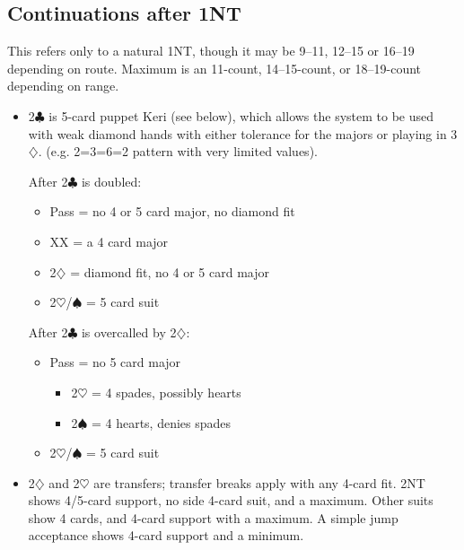 \documentclass[a4paper,14pt]{extarticle}
\begin{document}
\newpage

\subsection{Continuations after 1NT}
\label{sec:resp:1n}


This refers only to a natural 1NT, though it may be 9--11, 12--15 or 16--19
depending on route. Maximum is an 11-count, 14--15-count, or 18--19-count
depending on range.

\begin{itemize}

\item 2$\clubsuit$ is 5-card puppet Keri (see below), which allows the system to be used with weak diamond hands with either tolerance for the majors or playing in 3$\diamondsuit$. (e.g. 2=3=6=2 pattern with very limited values).

\label{note:9}

After 2$\clubsuit$ is doubled:

	\begin{itemize}
	\item Pass = no 4 or 5 card major, no diamond fit
	\item XX = a 4 card major
	\item 2$\diamondsuit$ = diamond fit, no 4 or 5 card major
	\item 2$\heartsuit$/$\spadesuit$ = 5 card suit
	\end{itemize}

After 2$\clubsuit$ is overcalled by 2$\diamondsuit$:
	
	\begin{itemize}
	\item Pass = no 5 card major
		\begin{itemize}
		\item 2$\heartsuit$ = 4 spades, possibly hearts
		\item 2$\spadesuit$ = 4 hearts, denies spades
		\end{itemize}
	\item 2$\heartsuit$/$\spadesuit$ = 5 card suit
	\end{itemize}

\item 2$\diamondsuit$ and 2$\heartsuit$ are transfers; transfer breaks apply with any 4-card fit.  2NT
shows 4/5-card support, no side 4-card suit, and a maximum.  Other suits
show 4 cards, and 4-card support with a maximum.  A simple jump acceptance
shows 4-card support and a minimum.


\end{itemize}
\end{document}
